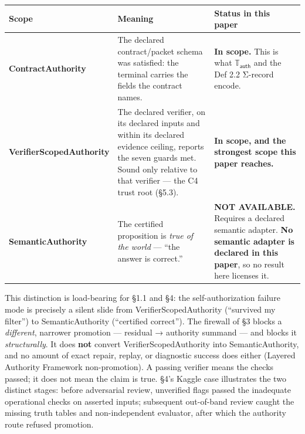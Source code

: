 \documentclass[
  10pt,
]{article}
\begin{document}
\begin{longtable}[]{@{}
  >{\raggedright\arraybackslash}p{}
  >{\raggedright\arraybackslash}p{}
  >{\raggedright\arraybackslash}p{}@{}}
\toprule\noalign{}
\begin{minipage}[b]{\linewidth}\raggedright
Scope
\end{minipage} & \begin{minipage}[b]{\linewidth}\raggedright
Meaning
\end{minipage} & \begin{minipage}[b]{\linewidth}\raggedright
Status in this paper
\end{minipage} \\
\midrule\noalign{}
\endhead
\bottomrule\noalign{}
\endlastfoot
\textbf{ContractAuthority} & The declared contract/packet schema was satisfied: the terminal carries the fields the contract names. & \textbf{In scope.} This is what \protect\hypertarget{math-E0029-0054}{}{\(\mathbb{T}_{\mathsf{auth}}\)} and the Def 2.2 Σ-record encode. \\
\textbf{VerifierScopedAuthority} & The declared verifier, on its declared inputs and within its declared evidence ceiling, reports the seven guards met. Sound only relative to that verifier --- the C4 trust root (§5.3). & \textbf{In scope, and the strongest scope this paper reaches.} \\
\textbf{SemanticAuthority} & The certified proposition is \emph{true of the world} --- ``the answer is correct.'' & \textbf{NOT AVAILABLE.} Requires a declared semantic adapter. \textbf{No semantic adapter is declared in this paper}, so no result here licenses it. \\
\end{longtable}

This distinction is load-bearing for §1.1 and §4: the self-authorization failure mode is precisely a silent slide from VerifierScopedAuthority (``survived my filter'') to SemanticAuthority (``certified correct''). The firewall of §3 blocks a \emph{different}, narrower promotion --- residual → authority summand --- and blocks it \emph{structurally}. It does \textbf{not} convert VerifierScopedAuthority into SemanticAuthority, and no amount of exact repair, replay, or diagnostic success does either (Layered Authority Framework non-promotion). A passing verifier means the checks passed; it does not mean the claim is true. §4's Kaggle case illustrates the two distinct stages: before adversarial review, unverified flags passed the inadequate operational checks on asserted inputs; subsequent out-of-band review caught the missing truth tables and non-independent evaluator, after which the authority route refused promotion.
\end{document}
